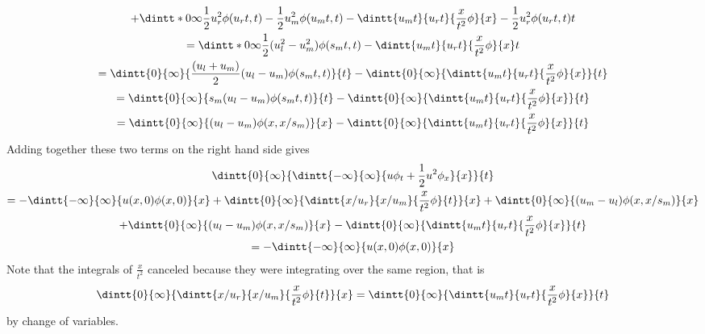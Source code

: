 \documentclass[11pt, oneside]{article}
\begin{document}
\begin{enumerate}
\begin{gather*}
      + \dintt*{0}{\infty}{\frac{1}{2}u_r^2 \phi(u_r t, t) - \frac{1}{2}u_m^2 \phi(u_m t, t) - \dintt{u_m t}{u_r t}{\frac{x}{t^2} \phi}{x} - \frac{1}{2}u_r^2 \phi(u_r t, t)}{t} \\
      = \dintt*{0}{\infty}{\frac{1}{2}(u_l^2 - u_m^2) \phi(s_m t, t) - \dintt{u_m t}{u_r t}{\frac{x}{t^2} \phi}{x}}{t} \\
      = \dintt{0}{\infty}{\frac{(u_l + u_m)}{2}(u_l - u_m) \phi(s_m t, t)}{t} - \dintt{0}{\infty}{\dintt{u_m t}{u_r t}{\frac{x}{t^2} \phi}{x}}{t} \\
      = \dintt{0}{\infty}{s_m(u_l - u_m) \phi(s_m t, t)}{t} - \dintt{0}{\infty}{\dintt{u_m t}{u_r t}{\frac{x}{t^2} \phi}{x}}{t} \\
      = \dintt{0}{\infty}{(u_l - u_m) \phi(x, x/s_m)}{x} - \dintt{0}{\infty}{\dintt{u_m t}{u_r t}{\frac{x}{t^2} \phi}{x}}{t}
    \end{gather*}
    Adding together these two terms on the right hand side gives
    \begin{gather*}
      \dintt{0}{\infty}{\dintt{-\infty}{\infty}{u \phi_t + \frac{1}{2} u^2 \phi_x}{x}}{t} \\
      = -\dintt{-\infty}{\infty}{u(x,0) \phi(x, 0)}{x} + \dintt{0}{\infty}{\dintt{x/u_r}{x/u_m}{\frac{x}{t^2}\phi}{t}}{x} + \dintt{0}{\infty}{(u_m - u_l)\phi(x, x/s_m)}{x} \\
      + \dintt{0}{\infty}{(u_l - u_m) \phi(x, x/s_m)}{x} - \dintt{0}{\infty}{\dintt{u_m t}{u_r t}{\frac{x}{t^2} \phi}{x}}{t} \\
      = -\dintt{-\infty}{\infty}{u(x,0) \phi(x, 0)}{x}
    \end{gather*}
    Note that the integrals of $\frac{x}{t^2}$ canceled because they were
    integrating over the same region, that is
    \[
      \dintt{0}{\infty}{\dintt{x/u_r}{x/u_m}{\frac{x}{t^2}\phi}{t}}{x} = \dintt{0}{\infty}{\dintt{u_m t}{u_r t}{\frac{x}{t^2} \phi}{x}}{t}
    \]
    by change of variables.


\end{enumerate}
\end{document}
